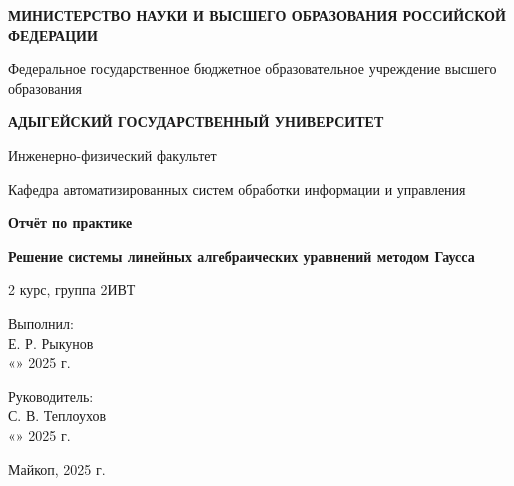 \documentclass[a4paper,12pt]{article}
\newcommand{\ministry}{МИНИСТЕРСТВО НАУКИ И ВЫСШЕГО ОБРАЗОВАНИЯ РОССИЙСКОЙ ФЕДЕРАЦИИ}
\newcommand{\university}{Федеральное государственное бюджетное образовательное учреждение высшего образования}
\newcommand{\universityname}{АДЫГЕЙСКИЙ ГОСУДАРСТВЕННЫЙ УНИВЕРСИТЕТ}
\newcommand{\faculty}{Инженерно-физический факультет}
\newcommand{\department}{Кафедра автоматизированных систем обработки информации и управления}
\newcommand{\reporttitle}{Отчёт по практике}
\newcommand{\reporttheme}{Решение системы линейных алгебраических уравнений методом Гаусса}
\newcommand{\studentinfo}{2 курс, группа 2ИВТ}
\newcommand{\studentname}{Е. Р. Рыкунов}
\newcommand{\supervisor}{С. В. Теплоухов}
\newcommand{\cityyear}{Майкоп, 2025 г.}
\begin{document}
\begin{titlepage}
    \vspace*{0.5cm}
    \centering
    
    \textbf{\ministry}
    
    \vspace{0.3cm}
    \university
    
    \vspace{0.3cm}
    \textbf{\universityname}
    
    \vspace{0.5cm}
    \faculty
    
    \department
    
    \vspace{2cm}
    \textbf{\reporttitle}
    
    \vspace{0.5cm}
    \textbf{\reporttheme}
    
    \vspace{2cm}
    \studentinfo
    
    \vfill
    
    \begin{flushright}
        \begin{minipage}{7cm}
            \noindent
            Выполнил: \\
            \underline{\hspace{3.8cm}} \studentname \\
            «\underline{\hspace{0.7cm}}» \underline{\hspace{2.5cm}} 2025 г. \\
            
            \vspace{0.5cm}
            
            Руководитель: \\
            \underline{\hspace{3.8cm}} \supervisor \\
            «\underline{\hspace{0.7cm}}» \underline{\hspace{2.5cm}} 2025 г. \\
        \end{minipage}
    \end{flushright}
    
    \vspace{1cm}
    \cityyear
\end{titlepage}

\newpage
\renewcommand{\contentsname}{Оглавление}
\tableofcontents
\end{document}
